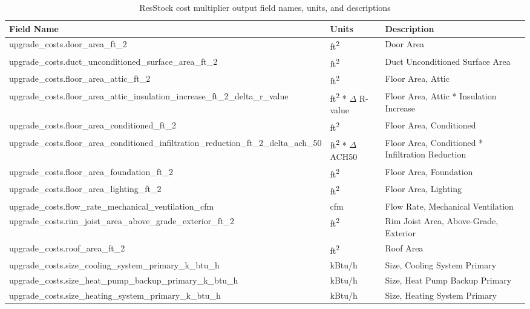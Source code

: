 \begin{longtable}[]{ |p{}|p{2.5cm}|p{6cm}| }
\caption{ResStock cost multiplier output field names, units, and descriptions} \label{table:cost_multipliers} \\
\toprule\noalign{}
\textbf{Field Name} & \textbf{Units} & \textbf{Description} \\
\midrule\noalign{}
\endhead
\bottomrule\noalign{}
\endlastfoot
upgrade\_costs.door\_area\_ft\_2 & ft\textsuperscript{2} & Door Area \\ \hline
upgrade\_costs.duct\_unconditioned\_surface\_area\_ft\_2 & ft\textsuperscript{2}& Duct Unconditioned Surface Area \\ \hline
upgrade\_costs.floor\_area\_attic\_ft\_2 & ft\textsuperscript{2}& Floor Area, Attic \\ \hline
upgrade\_costs.floor\_area\_attic\_insulation\_increase\_ft\_2\_delta\_r\_value & ft\textsuperscript{2} * $\Delta$ R-value& Floor Area, Attic * Insulation Increase \\ \hline
upgrade\_costs.floor\_area\_conditioned\_ft\_2 & ft\textsuperscript{2}& Floor Area, Conditioned \\ \hline
upgrade\_costs.floor\_area\_conditioned\_infiltration\_reduction\_ft\_2\_delta\_ach\_50 & ft\textsuperscript{2} * $\Delta$ ACH50& Floor Area, Conditioned * Infiltration Reduction \\ \hline
upgrade\_costs.floor\_area\_foundation\_ft\_2 & ft\textsuperscript{2}& Floor Area, Foundation \\ \hline
upgrade\_costs.floor\_area\_lighting\_ft\_2 & ft\textsuperscript{2}& Floor Area, Lighting \\ \hline
upgrade\_costs.flow\_rate\_mechanical\_ventilation\_cfm  & cfm & Flow Rate, Mechanical Ventilation \\ \hline
upgrade\_costs.rim\_joist\_area\_above\_grade\_exterior\_ft\_2  & ft\textsuperscript{2}& Rim Joist Area, Above-Grade, Exterior \\ \hline
upgrade\_costs.roof\_area\_ft\_2  &  ft\textsuperscript{2}& Roof Area \\ \hline
upgrade\_costs.size\_cooling\_system\_primary\_k\_btu\_h  & kBtu/h & Size, Cooling System Primary \\ \hline
upgrade\_costs.size\_heat\_pump\_backup\_primary\_k\_btu\_h & kBtu/h & Size, Heat Pump Backup Primary \\ \hline
upgrade\_costs.size\_heating\_system\_primary\_k\_btu\_h & kBtu/h & Size, Heating System Primary \\ \hline

\end{longtable}
